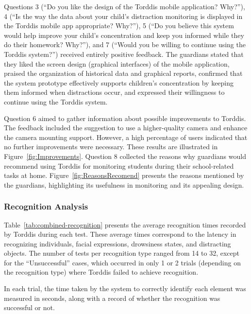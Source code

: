                 Questions 3 (“Do you like the design of the Torddis mobile application? Why?”), 4 (“Is the way the data about your child’s distraction monitoring is displayed in the Torddis mobile app appropriate? Why?”), 5 (“Do you believe this system would help improve your child’s concentration and keep you informed while they do their homework? Why?”), and 7 (“Would you be willing to continue using the Torddis system?”) received entirely positive feedback. The guardians stated that they liked the screen design (graphical interfaces) of the mobile application, praised the organization of historical data and graphical reports, confirmed that the system prototype effectively supports children's concentration by keeping them informed when distractions occur, and expressed their willingness to continue using the Torddis system.
                
                Question 6 aimed to gather information about possible improvements to Torddis. The feedback included the suggestion to use a higher-quality camera and enhance the camera mounting support. However, a high percentage of users indicated that no further improvements were necessary. These results are illustrated in Figure~\ref{fig:Improvements}. Question 8 collected the reasons why guardians would recommend using Torddis for monitoring students during their school-related tasks at home. Figure~\ref{fig:ReasonsRecomend} presents the reasons mentioned by the guardians, highlighting its usefulness in monitoring and its appealing design.
                
                \subsubsection{Recognition Analysis}
                Table~\ref{tab:combined-recognition} presents the average recognition times recorded by Torddis during each test. These average times correspond to the latency in recognizing individuals, facial expressions, drowsiness states, and distracting objects. The number of tests per recognition type ranged from 14 to 32, except for the “Unsuccessful” cases, which occurred in only 1 or 2 trials (depending on the recognition type) where Torddis failed to achieve recognition.
                
                In each trial, the time taken by the system to correctly identify each element was measured in seconds, along with a record of whether the recognition was successful or not.
                

